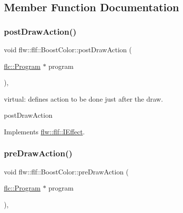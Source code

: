 \subsection{Member Function Documentation}
\mbox{\label{classflw_1_1flf_1_1BoostColor_a8ef5c9e32f4b210a4240d454021e4408}} 
\subsubsection{\texorpdfstring{post\+Draw\+Action()}{postDrawAction()}}
{\footnotesize\ttfamily void flw\+::flf\+::\+Boost\+Color\+::post\+Draw\+Action (\begin{DoxyParamCaption}\item[{\hyperlink{classflw_1_1flc_1_1Program}{flc\+::\+Program} $\ast$}]{program }\end{DoxyParamCaption})\hspace{0.3cm}{\ttfamily [override]}, {\ttfamily [virtual]}}



virtual\+: defines action to be done just after the draw. 

post\+Draw\+Action 

Implements \hyperlink{classflw_1_1flf_1_1IEffect_a6bb11d90e7e4da057ca398bd8c61208a}{flw\+::flf\+::\+I\+Effect}.

\mbox{\label{classflw_1_1flf_1_1BoostColor_a254c40ad807688df7bc7c8a2b8735338}} 
\subsubsection{\texorpdfstring{pre\+Draw\+Action()}{preDrawAction()}}
{\footnotesize\ttfamily void flw\+::flf\+::\+Boost\+Color\+::pre\+Draw\+Action (\begin{DoxyParamCaption}\item[{\hyperlink{classflw_1_1flc_1_1Program}{flc\+::\+Program} $\ast$}]{program }\end{DoxyParamCaption})\hspace{0.3cm}{\ttfamily [override]}, {\ttfamily [virtual]}}



